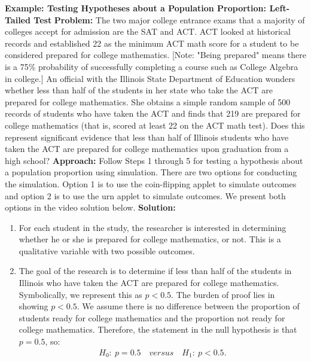\documentclass{report}
\begin{document}
    \pagebreak \bigbreak \noindent 
    \begin{mdframed}
      \textbf{Example: Testing Hypotheses about a Population Proportion: Left-Tailed Test}
      \bigbreak \noindent 
      \textbf{Problem:}
      The two major college entrance exams that a majority of colleges accept for admission are the SAT and ACT. ACT looked at historical records and established 22 as the minimum ACT math score for a student to be considered prepared for college mathematics. [Note: "Being prepared" means there is a 75\% probability of successfully completing a course such as College Algebra in college.] An official with the Illinois State Department of Education wonders whether less than half of the students in her state who take the ACT are prepared for college mathematics. She obtains a simple random sample of 500 records of students who have taken the ACT and finds that 219 are prepared for college mathematics (that is, scored at least 22 on the ACT math test). Does this represent significant evidence that less than half of Illinois students who have taken the ACT are prepared for college mathematics upon graduation from a high school?
      \bigbreak \noindent 
      \textbf{Approach:}
      Follow Steps 1 through 5 for testing a hypothesis about a population proportion using simulation. There are two options for conducting the simulation. Option 1 is to use the coin-flipping applet to simulate outcomes and option 2 is to use the urn applet to simulate outcomes. We present both options in the video solution below.
      \bigbreak \noindent 
      \textbf{Solution:}
      \begin{enumerate}
          \item For each student in the study, the researcher is interested in determining whether he or she is prepared for college mathematics, or not. This is a qualitative variable with two possible outcomes.
          \item The goal of the research is to determine if less than half of the students in Illinois  who have taken the ACT are prepared for college mathematics. Symbolically, we represent this as $p<0.5 $. The burden of proof lies in showing $p<0.5$. We assume there is no difference between the proportion of students ready for college mathematics and the proportion not ready for college mathematics. Therefore, the statement in the null hypothesis is that $p=0.5$, so:
              \begin{align*}
                  H_{0}:\ p=0.5 \quad versus \quad H_{1}:\ p<0.5
              .\end{align*}

\end{enumerate}
\end{mdframed}
\end{document}
